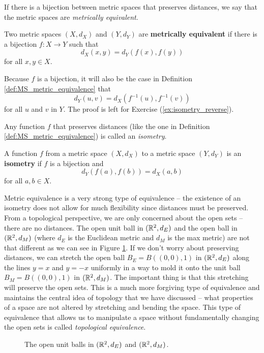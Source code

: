 If there is a bijection between metric spaces that preserves distances, we say that the metric spaces are \emph{metrically equivalent}.  

\begin{definition} \label{def:MS_metric_equivalence} Two metric spaces $(X,d_X)$ and $(Y,d_Y)$ are \textbf{metrically equivalent} if there is a bijection $f : X \to Y$ such that 
\[d_X(x,y) = d_Y(f(x),f(y))\]
for all $x,y \in X$. 
\end{definition}

Because $f$ is a bijection, it will also be the case in Definition \ref{def:MS_metric_equivalence} that 
\[d_Y(u,v) = d_X(f^{-1}(u), f^{-1}(v))\]
for all $u$ and $v$ in $Y$. The proof is left for Exercise (\ref{ex:isometry_reverse}). 

Any function $f$ that preserves distances (like the one in Definition \ref{def:MS_metric_equivalence}) is called an \emph{isometry}. 

\begin{definition} A function $f$ from a metric space $(X,d_X)$ to a metric space $(Y, d_Y)$ is an \textbf{isometry} if $f$ is a bijection and 
\begin{equation} \label{eq:distance_preserving} 
d_Y(f(a),f(b)) = d_X(a,b)
\end{equation}
for all $a, b \in X$. 
\end{definition}

Metric equivalence is a very strong type of equivalence -- the existence of an isometry does not allow for much flexibility since distances must be preserved. From a topological perspective, we are only concerned about the open sets -- there are no distances. The open unit ball in $(\mathbb{R}^2, d_E)$ and the open ball in $(\mathbb{R}^2, d_M)$ (where $d_E$ is the Euclidean metric and $d_M$ is the max metric) are not that different as we can see in Figure \ref{F:Equivalence}. If we don't worry about preserving distances, we can stretch the open ball $B_E = B((0,0),1)$ in $(\mathbb{R}^2, d_E)$ along the lines $y=x$ and $y=-x$ uniformly in a way to mold it onto the unit ball $B_M = B((0,0),1)$ in $(\mathbb{R}^2, d_M)$. The important thing is that this stretching will preserve the open sets. This is a much more forgiving type of equivalence and maintains the central idea of topology that we have discussed -- what properties of a space are not altered by stretching and bending the space. This type of equivalence that allows us to manipulate a space without fundamentally changing the open sets is called \emph{topological equivalence}. 
\begin{figure}[ht]
\begin{center}
\caption{The open unit balls in $(\mathbb{R}^2, d_E)$ and $(\mathbb{R}^2, d_M)$.}
\label{F:Equivalence}
\end{center}
\end{figure}


